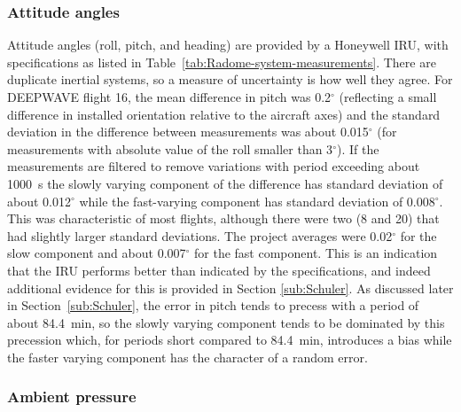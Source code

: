 \documentclass[12pt,twoside,english]{article}\usepackage[]{graphicx}\usepackage[]{color}
\let\OrgIndex\index
\renewcommand*{\index}[1]{\OrgIndex{#1}}
\begin{document}
\subsubsection{Attitude angles\label{sub:Attitude-angles}}

Attitude angles (roll, pitch,  and heading) are provided by a Honeywell IRU, with specifications as listed in Table~\ref{tab:Radome-system-measurements}. There are duplicate inertial systems, so a measure of uncertainty is how well they agree. For DEEPWAVE flight 16, the mean difference in pitch was 0.2$^{\circ}$ (reflecting a small difference in installed orientation relative to the aircraft axes) and the standard deviation in the difference between measurements was about 0.015$^{\circ}$ (for measurements with absolute value of the roll smaller than 3$^{\circ}$). If the measurements are filtered to remove variations with period exceeding about 1000~s the slowly varying component of the difference has standard deviation of about 0.012$^{\circ}$ while the fast-varying component has standard deviation of 0.008$^{\circ}$. This was characteristic of most flights, although there were two (8 and 20) that had slightly larger standard deviations. The project averages were 0.02$^{\circ}$ for the slow component and about 0.007$^{\circ}$ for the fast component. This is an indication that the IRU performs better than indicated by the specifications, and indeed additional evidence for this is provided in Section \ref{sub:Schuler}. As discussed later in Section~\ref{sub:Schuler}, the error in pitch tends to precess with a period of about 84.4~min, so the slowly varying component tends to be dominated by this precession which, for periods short compared to 84.4~min, introduces a bias while the faster varying component has the character of a random error. 


\subsubsection{Ambient pressure\label{sub:Ambient-pressure}}
\end{document}
